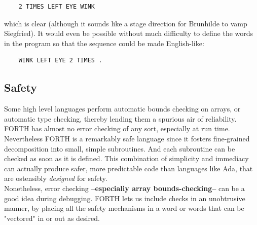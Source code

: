 \begin{lstlisting}
    2 TIMES LEFT EYE WINK
\end{lstlisting}

which is clear (although it sounds like a stage direction for Brunhilde to vamp Siegfried). It would even be possible without much difficulty to define the words in the program so that the sequence could be made English-like:

\begin{lstlisting}
    WINK LEFT EYE 2 TIMES .
\end{lstlisting}

\subsection{Safety}

Some high level languages perform automatic bounds checking on arrays, or automatic type checking, thereby lending them a spurious air of reliability. FORTH has almost no error checking of any sort, especially at run time. Nevertheless FORTH is a remarkably safe language since it fosters fine-grained decomposition into small, simple subroutines. And each subroutine can be checked as soon as it is defined. This combination of simplicity and immediacy can actually produce safer, more predictable code than languages like Ada, that are ostensibly \textit{designed} for safety.
\\

\leftbar[1\linewidth]
Nonetheless, error checking \textbf{--especialiy array bounds-checking--} can be a good idea during debugging. FORTH lets us include checks in an unobtrusive manner, by placing all the safety mechanisms in a word or words that can be "vectored" in or out as desired\footnotemark.
\endleftbar
{}
